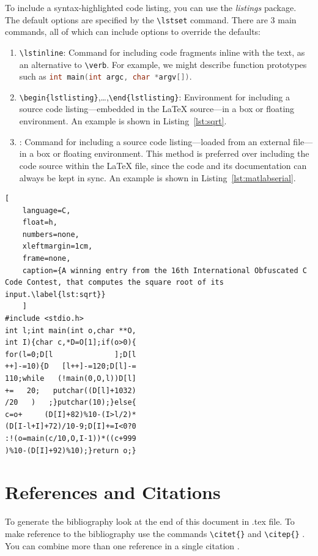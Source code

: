 \documentclass{UoNMCHA}
\numberwithin{equation}{section}
\begin{document}
To include a syntax-highlighted code listing, you can use the \emph{listings} package. The default options are specified by the \verb|\lstset| command. There are 3 main commands, all of which can include options to override the defaults:
\begin{enumerate}
    \item \verb|\lstinline|: Command for including code fragments inline with the text, as an alternative to \verb|\verb|. For example, we might describe function prototypes such as \lstinline[language=C,breaklines=true]|int main(int argc, char *argv[])|.
    \item \verb|\begin{lstlisting}|,\ldots,\verb|\end{lstlisting}|: Environment for including a source code listing---embedded in the LaTeX source---in a box or floating environment. An example is shown in Listing~\ref{lst:sqrt}.
    \item \verb||: Command for including a source code listing---loaded from an external file---in a box or floating environment. This method is preferred over including the code source within the LaTeX file, since the code and its documentation can always be kept in sync. An example is shown in Listing~\ref{lst:matlabserial}.
\end{enumerate}

\begin{lstlisting}[
    language=C,
    float=h,
    numbers=none,
    xleftmargin=1cm,
    frame=none,
    caption={A winning entry from the 16th International Obfuscated C Code Contest, that computes the square root of its input.\label{lst:sqrt}}
    ]
#include <stdio.h>
int l;int main(int o,char **O,
int I){char c,*D=O[1];if(o>0){
for(l=0;D[l              ];D[l
++]-=10){D   [l++]-=120;D[l]-=
110;while   (!main(0,O,l))D[l]
+=   20;   putchar((D[l]+1032)
/20   )   ;}putchar(10);}else{
c=o+     (D[I]+82)%10-(I>l/2)*
(D[I-l+I]+72)/10-9;D[I]+=I<0?0
:!(o=main(c/10,O,I-1))*((c+999
)%10-(D[I]+92)%10);}return o;}
\end{lstlisting}



\section{References and Citations}\label{sec:RefCite}
To generate the bibliography look at the end of this document in .tex file. To make reference to the bibliography use the commands \verb|\citet{}| and \verb|\citep{}| \citep{strunk2007elements}. You can combine more than one reference in a single citation \citep{troyka1999simon, jay1995write}.
\end{document}
